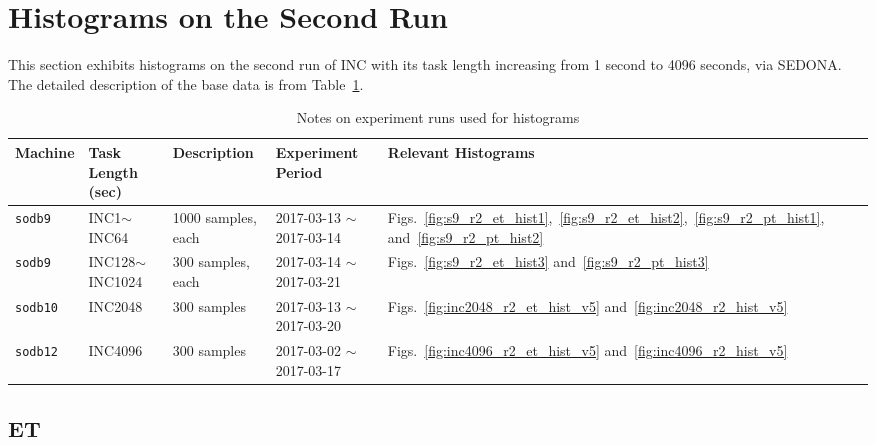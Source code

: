 \section{Histograms on the Second Run~\label{sec:sodb9_r2_hist}} 
This section exhibits histograms on the second run of 
INC with its task length increasing from 1 second to 4096 seconds, via SEDONA. 
The detailed description of the base data is from Table~\ref{tab:exp_notes2}.

\begin{table}[h]
\begin{center}
\begin{tabular}{|p{2cm}|p{3cm}|p{3cm}|p{4cm}|p{3.5cm}|} \hline
Machine & Task Length (sec) & Description & Experiment Period & Relevant \linebreak Histograms\\ \hline
{\tt sodb9} &  INC1$\sim$INC64 & 1000 samples, each & 2017-03-13 $\sim$ 2017-03-14 & Figs.~\ref{fig:s9_r2_et_hist1},~\ref{fig:s9_r2_et_hist2},~\ref{fig:s9_r2_pt_hist1}, and~\ref{fig:s9_r2_pt_hist2}\\ \hline
{\tt sodb9} &  INC128$\sim$INC1024 & 300 samples, each & 2017-03-14 $\sim$ 2017-03-21 & 
Figs.~\ref{fig:s9_r2_et_hist3} and~\ref{fig:s9_r2_pt_hist3}\\ \hline
{\tt sodb10} & INC2048 & 300 samples & 2017-03-13 $\sim$ 2017-03-20 & Figs.~\ref{fig:inc2048_r2_et_hist_v5} and~\ref{fig:inc2048_r2_hist_v5}\\ \hline
{\tt sodb12} & INC4096 & 300 samples & 2017-03-02 $\sim$ 2017-03-17 & Figs.~\ref{fig:inc4096_r2_et_hist_v5} and~\ref{fig:inc4096_r2_hist_v5}\\ \hline
\end{tabular}
\end{center}
\vspace{-.2in}
\caption{Notes on experiment runs used for histograms\label{tab:exp_notes2}}
\end{table}

\pagebreak

\subsection{ET}

